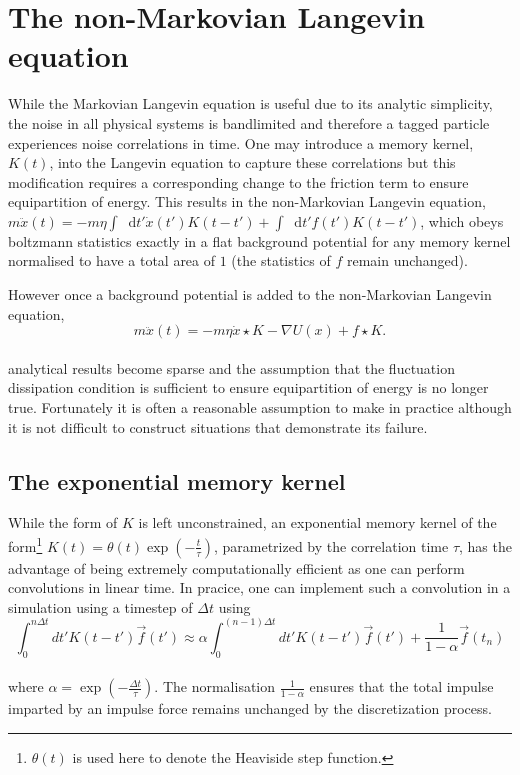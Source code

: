 \documentclass{article}
\newcommand*{\diff}{\mathop{}\!\mathrm{d}}
\begin{document}
\section{The non-Markovian Langevin equation}

While the Markovian Langevin equation is useful due to its analytic simplicity, the noise in all physical systems is bandlimited and therefore a tagged particle experiences noise correlations in time. One may introduce a memory kernel, $K(t)$, into the Langevin equation to capture these correlations but this modification requires a corresponding change to the friction term to ensure equipartition of energy. This results in the non-Markovian Langevin equation, $m\ddot{x}(t)=-m\eta\int\diff{t'}\dot{x}(t')K(t-t') + \int\diff{t'}f(t')K(t-t')$, which obeys boltzmann statistics exactly in a flat background potential for any memory kernel normalised to have a total area of $1$ (the statistics of $f$ remain unchanged). 

However once a background potential is added to the non-Markovian Langevin equation,
\\
\begin{equation}
	\label{eq:gle}
	m\ddot{x}(t)=-m\eta\dot{x} \star K - \nabla U(x) + f \star K.
\end{equation}
\\
analytical results become sparse and the assumption that the fluctuation dissipation condition is sufficient to ensure equipartition of energy is no longer true. Fortunately it is often a reasonable assumption to make in practice although it is not difficult to construct situations that demonstrate its failure.

\subsection{The exponential memory kernel}

While the form of $K$ is left unconstrained, an exponential memory kernel of the form\footnote{$\theta(t)$ is used here to denote the Heaviside step function.} $K(t)=\theta(t)\exp(-\frac{t}{\tau})$, parametrized by the correlation time $\tau$, has the advantage of being extremely computationally efficient as one can perform convolutions in linear time. In pracice, one can implement such a convolution in a simulation using a timestep of $\Delta{t}$ using
\\
$$
\int_0^{n\Delta{t}} dt' K\left(t-t'\right) \vec{f}(t') \approx \alpha \int_0^{(n-1)\Delta{t}} dt' K\left(t-t'\right) \vec{f}(t') + \frac{1}{1-\alpha} \vec{f}\left(t_n\right)
$$
\\
where $\alpha=\exp(-\frac{\Delta{t}}{\tau})$. The normalisation $\frac{1}{1-\alpha}$ ensures that the total impulse imparted by an impulse force remains unchanged by the discretization process.
\end{document}
